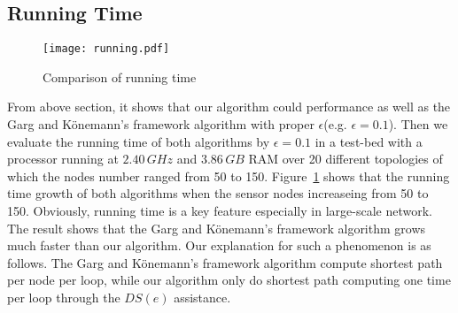 \documentclass{article}
\begin{document}
\subsection{Running Time}

\begin{figure}[H]
\centering
\texttt{[image: running.pdf]} 
\caption{Comparison of running time}
\label{f2}
\end{figure}
From above section, it shows that our algorithm could performance as well as the Garg and K\"{o}nemann's framework algorithm with proper $\epsilon$(e.g. $\epsilon = 0.1$). Then we evaluate the running time of both algorithms by $\epsilon =0.1$ in a test-bed with a processor running at $2.40\,GHz$ and $3.86\,GB$ RAM over 20 different topologies of which the nodes number ranged from 50 to 150.
Figure~\ref{f2} shows that the running time growth of both algorithms when the sensor nodes increaseing from 50 to 150. Obviously, running time is a key feature especially in large-scale network. The result shows that the Garg and K\"{o}nemann's framework algorithm 
grows much faster than our algorithm. Our explanation for such a phenomenon is as follows. The Garg and K\"{o}nemann's framework algorithm compute shortest path per node per loop, while our algorithm only do shortest path computing one time per loop through the $DS(e)$ assistance. 




\end{document}
